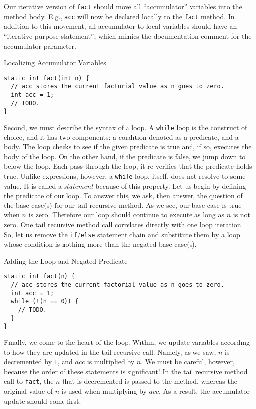 Our iterative version of \texttt{fact} should move all ``accumulator'' variables into the method body. E.g., \texttt{acc} will now be declared locally to the \texttt{fact} method. In addition to this movement, all accumulator-to-local variables should have an ``iterative purpose statement'', which mimics the documentation comment for the accumulator parameter.

\begin{cl}[]{Localizing Accumulator Variables}
\begin{lstlisting}[language=MyJava]
static int fact(int n) {
  // acc stores the current factorial value as n goes to zero.
  int acc = 1;
  // TODO.
}
\end{lstlisting}
\end{cl}

Second, we must describe the syntax of a loop. A \texttt{while} loop is the construct of choice, and it has two components: a condition denoted as a predicate, and a body. The loop checks to see if the given predicate is true and, if so, executes the body of the loop. On the other hand, if the predicate is false, we jump down to below the loop. Each pass through the loop, it re-verifies that the predicate holds true. Unlike expressions, however, a \texttt{while} loop, itself, does not resolve to some value. It is called a \textit{statement} because of this property. Let us begin by defining the predicate of our loop. To answer this, we ask, then answer, the question of the base case(s) for our tail recursive method. As we see, our base case is true when $n$ is zero. Therefore our loop should continue to execute as long as $n$ is not zero. One tail recursive method call correlates directly with one loop iteration. So, let us remove the \texttt{if}/\texttt{else} statement chain and substitute them by a loop whose condition is nothing more than the negated base case(s).

\begin{cl}[]{Adding the Loop and Negated Predicate}
\begin{lstlisting}[language=MyJava]
static int fact(n) {
  // acc stores the current factorial value as n goes to zero.
  int acc = 1;
  while (!(n == 0)) {
    // TODO.
  }
}
\end{lstlisting}
\end{cl}

Finally, we come to the heart of the loop. Within, we update variables according to how they are updated in the tail recursive call. Namely, as we saw, $n$ is decremented by $1$, and $\textit{acc}$ is multiplied by $n$. We must be careful, however, because the order of these statements is significant! In the tail recursive method call to \texttt{fact}, the $n$ that is decremented is passed to the method, whereas the original value of $n$ is used when multiplying by $\textit{acc}$. As a result, the accumulator update should come first.

